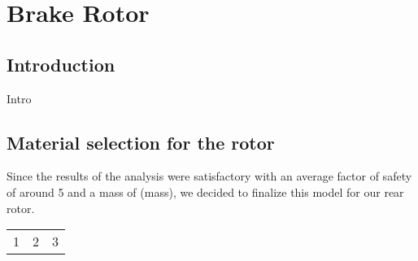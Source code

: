 \chapter{Brake Rotor}
\section{Introduction}
Intro
\section{Material selection for the rotor}


Since the results of the analysis were satisfactory with an average factor of safety of around 5 and a mass of (mass), we decided to finalize this model for our rear rotor.

\begin{center}
	\begin{tabular}{lll}
		1 & 2 & 3 
	\end{tabular}
\end{center}
	
